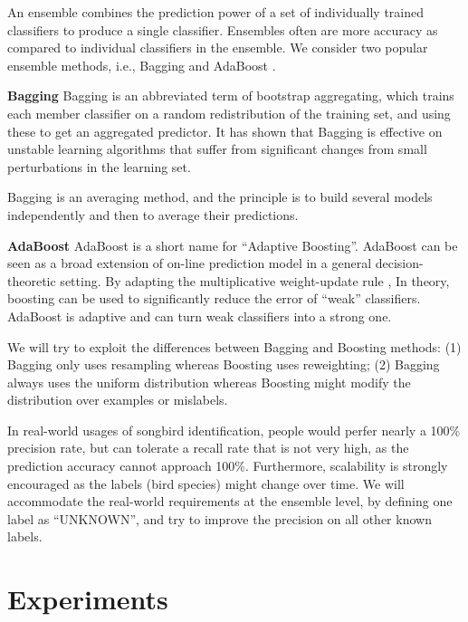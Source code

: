 \documentclass{article} %
\begin{document}
An ensemble combines the prediction power of a set of individually trained classifiers to produce a single classifier. Ensembles often are more accuracy as compared to individual classifiers in the ensemble. We consider two popular ensemble methods, i.e., Bagging \cite{breiman1996bagging} and AdaBoost \cite{freund1997decision}.

\textbf{Bagging} Bagging is an abbreviated term of bootstrap aggregating, which trains each member classifier on a random redistribution of the training set, and using these to get
an aggregated predictor. It has shown that Bagging is effective on unstable learning algorithms that suffer from significant changes from small perturbations in the learning set.

Bagging is an averaging method, and the principle is to build several models independently and then to average their predictions.

\textbf{AdaBoost} AdaBoost is a short name for ``Adaptive Boosting''. AdaBoost can be seen as a broad extension of on-line prediction model in a general decision-theoretic setting. By adapting the multiplicative weight-update rule \cite{littlestone1994weighted}, In theory, boosting can be used to significantly reduce the error of ``weak'' classifiers. AdaBoost is adaptive and can turn weak classifiers into a strong one.

We will try to exploit the differences between Bagging and Boosting methods: (1) Bagging only uses resampling whereas Boosting uses reweighting; (2) Bagging always uses the uniform distribution whereas Boosting might modify the distribution over examples or mislabels.

In real-world usages of songbird identification, people would perfer nearly a 100\% precision rate, but can tolerate a  recall rate that is not very high, as the prediction accuracy cannot approach 100\%. Furthermore, scalability is strongly encouraged as the labels (bird species) might change over time. We will accommodate the real-world requirements at the ensemble level, by defining one label as ``UNKNOWN'', and try to improve the precision on all other known labels. 


\section{Experiments}
\end{document}

